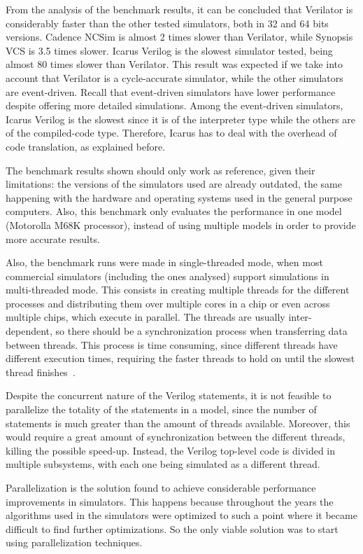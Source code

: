From the analysis of the benchmark results, it can be concluded that Verilator
is considerably faster than the other tested simulators, both in 32 and 64 bits
versions. Cadence NCSim is almost 2 times slower than Verilator, while Synopsis
VCS is 3.5 times slower. Icarus Verilog is the slowest simulator tested, being
almost 80 times slower than Verilator. This result was expected if we take into
account that Verilator is a cycle-accurate simulator, while the other simulators
are event-driven. Recall that event-driven simulators have lower performance
despite offering more detailed simulations. Among the event-driven simulators,
Icarus Verilog is the slowest since it is of the interpreter type while the
others are of the compiled-code type. Therefore, Icarus has to deal with the
overhead of code translation, as explained before.

The benchmark results shown should only work as reference, given their
limitations: the versions of the simulators used are already outdated, the same
happening with the hardware and operating systems used in the general purpose
computers. Also, this benchmark only evaluates the performance in one model
(Motorolla M68K processor), instead of using multiple models in order to provide
more accurate results.

Also, the benchmark runs were made in single-threaded mode, when most commercial
simulators (including the ones analysed) support simulations in multi-threaded
mode. This consists in creating multiple threads for the different processes and
distributing them over multiple cores in a chip or even across multiple chips,
which execute in parallel. The threads are usually inter-dependent, so there
should be a synchronization process when transferring data between threads. This
process is time consuming, since different threads have different execution
times, requiring the faster threads to hold on until the slowest thread
finishes~\cite{tan:vhstas}.

Despite the concurrent nature of the Verilog statements, it is not feasible to
parallelize the totality of the statements in a model, since the number of
statements is much greater than the amount of threads available. Moreover, this
would require a great amount of synchronization between the different threads,
killing the possible speed-up. Instead, the Verilog top-level code is divided in
multiple subsystems, with each one being simulated as a different thread.

Parallelization is the solution found to achieve considerable performance
improvements in simulators. This happens because throughout the years the
algorithms used in the simulators were optimized to such a point where it became
difficult to find further optimizations. So the only viable solution was to
start using parallelization techniques.

